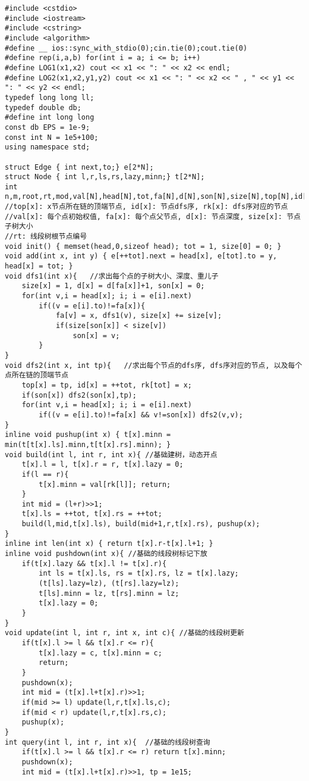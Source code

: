 \documentclass[twoside]{article}
\begin{document}
\begin{lstlisting}
#include <cstdio>
#include <iostream>
#include <cstring>
#include <algorithm>
#define __ ios::sync_with_stdio(0);cin.tie(0);cout.tie(0)
#define rep(i,a,b) for(int i = a; i <= b; i++)
#define LOG1(x1,x2) cout << x1 << ": " << x2 << endl;
#define LOG2(x1,x2,y1,y2) cout << x1 << ": " << x2 << " , " << y1 << ": " << y2 << endl;
typedef long long ll;
typedef double db;
#define int long long
const db EPS = 1e-9;
const int N = 1e5+100;
using namespace std;

struct Edge { int next,to;} e[2*N];
struct Node { int l,r,ls,rs,lazy,minn;} t[2*N];
int n,m,root,rt,mod,val[N],head[N],tot,fa[N],d[N],son[N],size[N],top[N],id[N],rk[N];
//top[x]: x节点所在链的顶端节点, id[x]: 节点dfs序, rk[x]: dfs序对应的节点
//val[x]: 每个点初始权值, fa[x]: 每个点父节点, d[x]: 节点深度, size[x]: 节点子树大小
//rt: 线段树根节点编号
void init() { memset(head,0,sizeof head); tot = 1, size[0] = 0; }
void add(int x, int y) { e[++tot].next = head[x], e[tot].to = y, head[x] = tot; }
void dfs1(int x){	//求出每个点的子树大小、深度、重儿子
	size[x] = 1, d[x] = d[fa[x]]+1, son[x] = 0;
	for(int v,i = head[x]; i; i = e[i].next)
		if((v = e[i].to)!=fa[x]){
			fa[v] = x, dfs1(v), size[x] += size[v];
			if(size[son[x]] < size[v])
				son[x] = v;
		}
}
void dfs2(int x, int tp){	//求出每个节点的dfs序, dfs序对应的节点, 以及每个点所在链的顶端节点
	top[x] = tp, id[x] = ++tot, rk[tot] = x;
	if(son[x]) dfs2(son[x],tp);
	for(int v,i = head[x]; i; i = e[i].next)
		if((v = e[i].to)!=fa[x] && v!=son[x]) dfs2(v,v);
}
inline void pushup(int x) { t[x].minn = min(t[t[x].ls].minn,t[t[x].rs].minn); }
void build(int l, int r, int x){ //基础建树，动态开点
	t[x].l = l, t[x].r = r, t[x].lazy = 0;
	if(l == r){
		t[x].minn = val[rk[l]]; return;
	}
	int mid = (l+r)>>1;
	t[x].ls = ++tot, t[x].rs = ++tot;
	build(l,mid,t[x].ls), build(mid+1,r,t[x].rs), pushup(x);
}
inline int len(int x) { return t[x].r-t[x].l+1; }
inline void pushdown(int x){ //基础的线段树标记下放
	if(t[x].lazy && t[x].l != t[x].r){
		int ls = t[x].ls, rs = t[x].rs, lz = t[x].lazy;
		(t[ls].lazy=lz), (t[rs].lazy=lz);
		t[ls].minn = lz, t[rs].minn = lz;
		t[x].lazy = 0;
	}
}
void update(int l, int r, int x, int c){ //基础的线段树更新
	if(t[x].l >= l && t[x].r <= r){
		t[x].lazy = c, t[x].minn = c;
		return;
	}
	pushdown(x);
	int mid = (t[x].l+t[x].r)>>1;
	if(mid >= l) update(l,r,t[x].ls,c);
	if(mid < r) update(l,r,t[x].rs,c);
	pushup(x);
}
int query(int l, int r, int x){	 //基础的线段树查询
	if(t[x].l >= l && t[x].r <= r) return t[x].minn;
	pushdown(x);
	int mid = (t[x].l+t[x].r)>>1, tp = 1e15;

\end{lstlisting}
\end{document}
